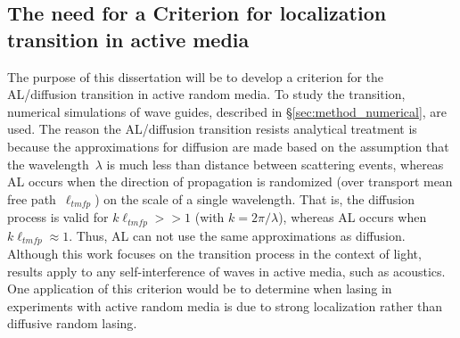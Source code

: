 \subsection{The need for a Criterion for localization transition in active media}
\label{sec:thesis_statement}
The purpose of this dissertation will be to develop a criterion for the AL/diffusion transition in active random media. 
To study the transition, numerical simulations of wave guides, described in \S \ref{sec:method_numerical}, are used.
The reason the AL/diffusion transition resists analytical treatment is because the approximations for diffusion are made based on the assumption that the wavelength~$\lambda$ is much less than distance between scattering events, whereas AL occurs when the direction of propagation is randomized (over transport mean free path~$\ell_{tmfp}$) on the scale of a single wavelength. That is, the diffusion process is valid for $k \ell_{tmfp} >> 1$ (with $k=2 \pi/\lambda$), whereas AL occurs when $k \ell_{tmfp} \approx 1$\cite{1960_Ioffe_criterion}. Thus, AL can not use the same approximations as diffusion.
Although this work focuses on the transition process in the context of light, results apply to any self-interference of waves in active media, such as acoustics\cite{1985_Kirkpatrick}\cite{2006_Yamilov_Weaver}\cite{2008_van_Tiggelen_Nature}.
 One application of this criterion would be to determine when lasing in experiments with active random media \cite{1999_Cao_RandomLaserPRL}\cite{2005_Cao} is due to strong localization rather than diffusive random lasing\cite{2008_Wiersma}.

